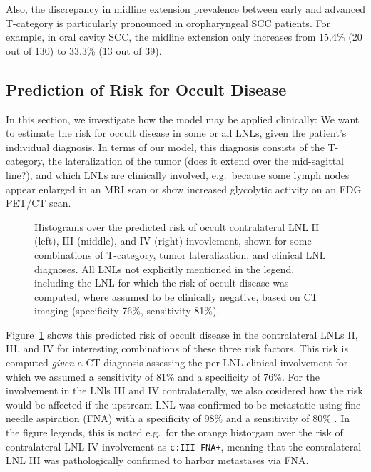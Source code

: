 \documentclass[
  sn-mathphys-num,
]{sn-jnl}
\begin{document}
Also, the discrepancy in midline extension prevalence between early and
advanced T-category is particularly pronounced in oropharyngeal SCC
patients. For example, in oral cavity SCC, the midline extension only
increases from 15.4\% (20 out of 130) to 33.3\% (13 out of 39).

\subsection{Prediction of Risk for Occult
Disease}\label{prediction-of-risk-for-occult-disease}

In this section, we investigate how the model may be applied clinically:
We want to estimate the risk for occult disease in some or all LNLs,
given the patient's individual diagnosis. In terms of our model, this
diagnosis consists of the T-category, the lateralization of the tumor
(does it extend over the mid-sagittal line?), and which LNLs are
clinically involved, e.g.~because some lymph nodes appear enlarged in an
MRI scan or show increased glycolytic activity on an FDG PET/CT scan.

\begin{figure}


\caption{\label{fig-model-risks}Histograms over the predicted risk of
occult contralateral LNL II (left), III (middle), and IV (right)
invovlement, shown for some combinations of T-category, tumor
lateralization, and clinical LNL diagnoses. All LNLs not explicitly
mentioned in the legend, including the LNL for which the risk of occult
disease was computed, where assumed to be clinically negative, based on
CT imaging (specificity 76\%, sensitivity 81\%).}

\end{figure}%

Figure~\ref{fig-model-risks} shows this predicted risk of occult disease
in the contralateral LNLs II, III, and IV for interesting combinations
of these three risk factors. This risk is computed \emph{given} a CT
diagnosis assessing the per-LNL clinical involvement for which we
assumed a sensitivity of 81\% and a specificity of 76\%. For the
involvement in the LNls III and IV contralaterally, we also cosidered
how the risk would be affected if the upstream LNL was confirmed to be
metastatic using fine needle aspiration (FNA) with a specificity of 98\%
and a sensitivity of 80\% \citep{de_bondt_detection_2007}. In the figure
legends, this is noted e.g.~for the orange historgam over the risk of
contralateral LNL IV involvement as \texttt{c:III\ FNA+}, meaning that
the contralateral LNL III was pathologically confirmed to harbor
metastases via FNA.
\end{document}
